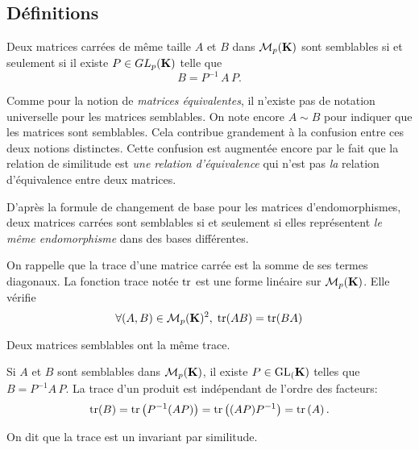\subsection{Définitions}
\begin{defi}
  Deux matrices carrées de même taille $A$ et $B$ dans $\mathcal{M}_p(\mathbf{K})$ sont semblables si et seulement si il existe $P\in GL_p(\mathbf{K})$ telle que 
\begin{displaymath}
  B = P^{-1}\, A\, P.
\end{displaymath}
\end{defi}
\begin{rem}
 Comme pour la notion de \emph{matrices équivalentes}, il n'existe pas de notation universelle pour les matrices semblables. On note encore $A \sim B$ pour indiquer que les matrices sont semblables. Cela contribue grandement à la confusion entre ces deux notions distinctes. Cette confusion est augmentée encore par le fait que la relation de similitude est \emph{une relation d'équivalence} qui n'est pas \emph{la} relation d'équivalence entre deux matrices.
\end{rem}
\begin{rem}
  D'après la formule de changement de base pour les matrices d'endomorphismes, deux matrices carrées sont semblables si et seulement si elles représentent \emph{le même endomorphisme} dans des bases différentes.
\end{rem}

On rappelle que la trace  d'une matrice carrée est la somme de ses termes diagonaux. La fonction trace notée $\mathop{\mathrm{tr}}$ est une forme linéaire sur $\mathcal{M}_p(\mathbf{K})$. Elle vérifie
\begin{displaymath}
  \forall (A,B)\in \mathcal{M}_p(\mathbf{K})^2,\; \mathop{\mathrm{tr}}(AB) = \mathop{\mathrm{tr}}(BA)
\end{displaymath}
\begin{propn}
  Deux matrices semblables ont la même trace.
\end{propn}
\begin{demo}
 Si $A$ et $B$ sont semblables dans $\mathcal{M}_p(\mathbf{K})$, il existe $P\in \text{GL}_(\mathbf{K})$ telles que $B = P^{-1}A\,P$. La trace d'un produit est indépendant de l'ordre des facteurs:
\[
 \mathop{\mathrm{tr}}(B) = \mathop{\mathrm{tr}}\left( P^{-1}(AP)\right) = \mathop{\mathrm{tr}}\left( (AP)P^{-1}\right) = \mathop{\mathrm{tr}}\left( A\right) . 
\]
\end{demo}
\begin{rem}
  On dit que la trace est un invariant par similitude.
\end{rem}


